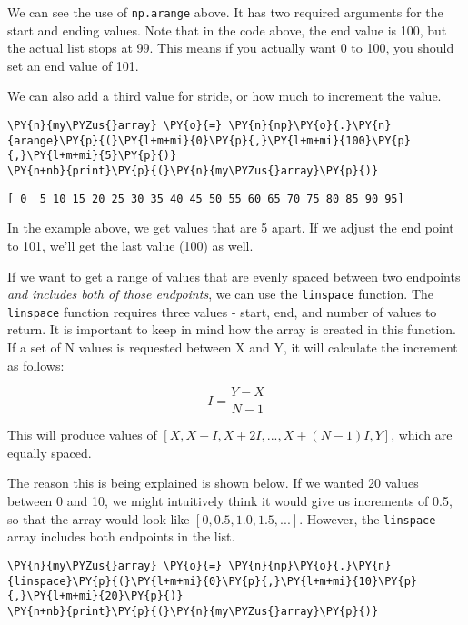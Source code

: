     We can see the use of \texttt{np.arange} above. It has two required
arguments for the start and ending values. Note that in the code above,
the end value is 100, but the actual list stops at 99. This means if you
actually want 0 to 100, you should set an end value of 101.

We can also add a third value for stride, or how much to increment the
value.

    \begin{tcolorbox}[breakable, size=fbox, boxrule=1pt, pad at break*=1mm,colback=cellbackground, colframe=cellborder]
\begin{Verbatim}[commandchars=\\\{\}]
\PY{n}{my\PYZus{}array} \PY{o}{=} \PY{n}{np}\PY{o}{.}\PY{n}{arange}\PY{p}{(}\PY{l+m+mi}{0}\PY{p}{,}\PY{l+m+mi}{100}\PY{p}{,}\PY{l+m+mi}{5}\PY{p}{)}
\PY{n+nb}{print}\PY{p}{(}\PY{n}{my\PYZus{}array}\PY{p}{)}
\end{Verbatim}
\end{tcolorbox}

    \begin{Verbatim}[commandchars=\\\{\}]
[ 0  5 10 15 20 25 30 35 40 45 50 55 60 65 70 75 80 85 90 95]
    \end{Verbatim}

    In the example above, we get values that are 5 apart. If we adjust the
end point to 101, we'll get the last value (100) as well.

If we want to get a range of values that are evenly spaced between two
endpoints \emph{and includes both of those endpoints}, we can use the
\texttt{linspace} function. The \texttt{linspace} function requires
three values - start, end, and number of values to return. It is
important to keep in mind how the array is created in this function. If
a set of N values is requested between X and Y, it will calculate the
increment as follows:

\[ I = \frac{Y-X}{N-1} \]

This will produce values of \([X, X+I, X+2I, ..., X+(N-1)I, Y]\), which
are equally spaced.

The reason this is being explained is shown below. If we wanted 20
values between 0 and 10, we might intuitively think it would give us
increments of 0.5, so that the array would look like
\([0,0.5,1.0,1.5,...]\). However, the \texttt{linspace} array includes
both endpoints in the list.

    \begin{tcolorbox}[breakable, size=fbox, boxrule=1pt, pad at break*=1mm,colback=cellbackground, colframe=cellborder]
\begin{Verbatim}[commandchars=\\\{\}]
\PY{n}{my\PYZus{}array} \PY{o}{=} \PY{n}{np}\PY{o}{.}\PY{n}{linspace}\PY{p}{(}\PY{l+m+mi}{0}\PY{p}{,}\PY{l+m+mi}{10}\PY{p}{,}\PY{l+m+mi}{20}\PY{p}{)}
\PY{n+nb}{print}\PY{p}{(}\PY{n}{my\PYZus{}array}\PY{p}{)}
\end{Verbatim}
\end{tcolorbox}

